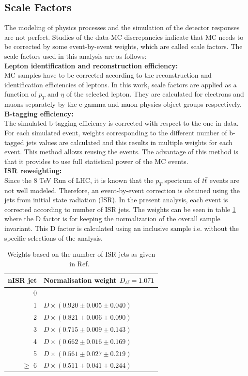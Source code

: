\subsection{Scale Factors}
\label{sec:SF}
The modeling of physics processes and the simulation of the detector responses are not perfect. Studies of the data-MC discrepancies indicate that MC needs to be corrected by some event-by-event weights, which are called scale factors. The scale factors used in this analysis are as follows:\\
\textbf{Lepton identification and reconstruction efficiency:}\\
MC samples have to be corrected according to the reconstruction and identification efficiencies of leptons.
In this work, scale factors are applied as a function of $p_{T}$ and $\eta$ of the selected lepton. They are calculated for electrons and muons separately by the e-gamma and muon physics object groups respectively\cite{leptonSF}.\\
\textbf{B-tagging efficiency:}\\
The simulated b-tagging efficiency is corrected with respect to the one in data. For each simulated event, weights corresponding to the different number of b-tagged jets values are calculated and this results in multiple weights for each event\cite{leptonSF}. This method allows reusing the events. The advantage of this method is that it provides to use full statistical power of the MC events.\\
\textbf{ISR reweighting:}\\
Since the 8 TeV Run of LHC, it is known that the $p_T$ spectrum of $t\bar{t}$ events are not well modeled. Therefore, an event-by-event correction is obtained using the jets from initial state radiation (ISR).
 In the present analysis, each event is corrected according to number of ISR jets. The weights can be seen in table \ref{tab:nISRweights} where the D factor is for keeping the normalization of the overall sample invariant. This D factor is calculated using an inclusive sample i.e. without the specific selections of the analysis.
 \renewcommand{\arraystretch}{1.5}
\begin{table}[htbp]
\begin{center}
\caption{Weights based on the number of ISR jets as given in Ref.~\cite{nISRweightTTbar}}
\begin{tabular}{|r|l|}
\hline
\multicolumn{1}{|l|}{nISR jet} & Normalisation weight $D_{t\bar{t}} = 1.071$ \\ \hline
0 &  \\ \hline
1 & $D \times (0.920 \pm 0.005 \pm 0.040)$ \\ \hline
2 & $D \times (0.821 \pm 0.006 \pm 0.090)$ \\ \hline
3 & $D \times (0.715 \pm 0.009 \pm 0.143)$ \\ \hline
4 & $D \times (0.662 \pm 0.016 \pm 0.169)$ \\ \hline
5 & $D \times (0.561 \pm 0.027 \pm 0.219)$ \\ \hline
$\geq$ 6& $D \times (0.511 \pm 0.041 \pm 0.244)$ \\ \hline
\end{tabular}
\label{tab:nISRweights}
\end{center}
\end{table}
